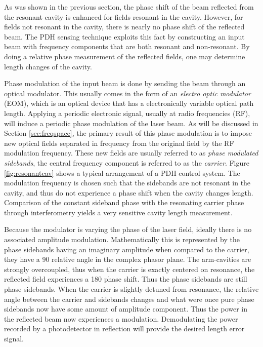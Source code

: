 As was shown in the previous section, the phase shift of the beam reflected from the resonant cavity is enhanced for fields resonant in the cavity. %
However, for fields not resonant in the cavity, there is nearly no phase shift of the reflected beam. %
The PDH sensing technique exploits this fact by constructing an input beam with frequency components that are both resonant and non-resonant. %
By doing a relative phase measurement of the reflected fields, one may determine length changes of the cavity.

Phase modulation of the input beam is done by sending the beam through an optical modulator. %
This usually comes in the form of an \emph{electro optic modulator} (EOM), which is an optical device that has a electronically variable optical path length. %
Applying a periodic electronic signal, usually at radio frequencies (RF), will induce a periodic phase modulation of the laser beam. %
As will be discussed in Section \ref{sec:freqspace}, the primary result of this phase modulation is to impose new optical fields separated in frequency from the original field by the RF modulation frequency. %
These new fields are usually referred to as \emph{phase modulated sidebands}, the central frequency component is referred to as the \emph{carrier}. %
Figure \ref{fig:resonantcav} shows a typical arrangement of a PDH control system. %
The modulation frequency is chosen such that the sidebands are not resonant in the cavity, and thus do not experience a phase shift when the cavity changes length. %
Comparison of the constant sideband phase with the resonating carrier phase through interferometry yields a very sensitive cavity length measurement. %


Because the modulator is varying the phase of the laser field, ideally there is no associated amplitude modulation. %
Mathematically this is represented by the phase sidebands having an imaginary amplitude when compared to the carrier, they have a 90\degrees{} relative angle in the complex phasor plane. %
The arm-cavities are strongly overcoupled, thus when the carrier is exactly centered on resonance, the reflected field experiences a 180\degrees{} phase shift. %
Thus the phase sidebands are still phase sidebands. %
When the carrier is slightly detuned from resonance, the relative angle between the carrier and sidebands changes and what were once pure phase sidebands now have some amount of amplitude component. %
Thus the power in the reflected beam now experiences a modulation. %
Demodulating the power recorded by a photodetector in reflection will provide the desired length error signal.


